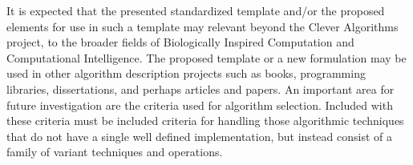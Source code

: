 \documentclass[a4paper, 11pt]{article}
\begin{document}
It is expected that the presented standardized template and/or the proposed elements for use in such a template may relevant beyond the Clever Algorithms project, to the broader fields of Biologically Inspired Computation and Computational Intelligence. The proposed template or a new formulation may be used in other algorithm description projects such as books, programming libraries, dissertations, and perhaps articles and papers.
An important area for future investigation are the criteria used for algorithm selection. Included with these criteria must be included criteria for handling those algorithmic techniques that do not have a single well defined implementation, but instead consist of a family of variant techniques and operations.



\end{document}
